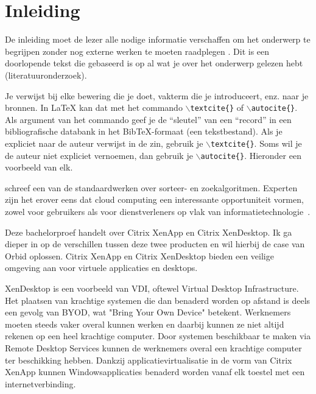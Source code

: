
\chapter{Inleiding}
\label{ch:inleiding}

De inleiding moet de lezer alle nodige informatie verschaffen om het onderwerp te begrijpen zonder nog externe werken te moeten raadplegen \autocite{Pollefliet2011}. Dit is een doorlopende tekst die gebaseerd is op al wat je over het onderwerp gelezen hebt (literatuuronderzoek).

Je verwijst bij elke bewering die je doet, vakterm die je introduceert, enz. naar je bronnen. In \LaTeX{} kan dat met het commando \texttt{$\backslash${textcite\{\}}} of \texttt{$\backslash${autocite\{\}}}. Als argument van het commando geef je de ``sleutel'' van een ``record'' in een bibliografische databank in het Bib\TeX{}-formaat (een tekstbestand). Als je expliciet naar de auteur verwijst in de zin, gebruik je \texttt{$\backslash${}textcite\{\}}.
Soms wil je de auteur niet expliciet vernoemen, dan gebruik je \texttt{$\backslash${}autocite\{\}}. Hieronder een voorbeeld van elk.

\textcite{Knuth1998} schreef een van de standaardwerken over sorteer- en zoekalgoritmen. Experten zijn het erover eens dat cloud computing een interessante opportuniteit vormen, zowel voor gebruikers als voor dienstverleners op vlak van informatietechnologie~\autocite{Creeger2009}.

Deze bachelorproef handelt over Citrix XenApp en Citrix XenDesktop. Ik ga dieper in op de verschillen tussen deze twee producten en wil hierbij de case van Orbid oplossen. Citrix XenApp en Citrix XenDesktop bieden een veilige omgeving aan voor virtuele applicaties en desktops.

XenDesktop is een voorbeeld van VDI, oftewel Virtual Desktop Infrastructure. Het plaatsen van krachtige systemen die dan benaderd worden op afstand is deels een gevolg van BYOD, wat "Bring Your Own Device" betekent. Werknemers moeten steeds vaker overal kunnen werken en daarbij kunnen ze niet altijd rekenen op een heel krachtige computer. Door systemen beschikbaar te maken via Remote Desktop Services kunnen de werknemers overal een krachtige computer ter beschikking hebben. Dankzij applicatievirtualisatie in de vorm van Citrix XenApp kunnen Windowsapplicaties benaderd worden vanaf elk toestel met een internetverbinding.



